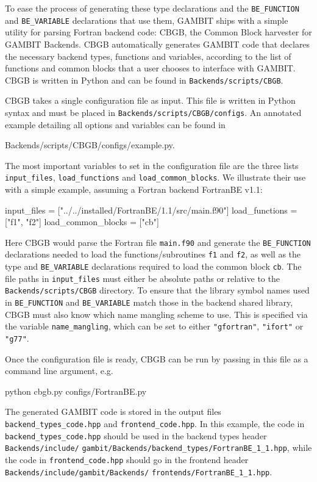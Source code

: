 \documentclass[pdftex,twocolumn,epjc3_preprint,runningheads]{svjour3}
\renewcommand{\_}{\discretionary{\underscore}{}{\underscore}}
\newcommand\cpp[1]{{\lstinline!#1!}}  %
\newcommand\term[1]{{\lstset{style=terminal}\lstinline!#1!\lstset{style=cpp}}}
\newcommand\fortran[1]{{\lstset{style=fortran}\lstinline!#1!\lstset{style=cpp}}}
\newcommand\py[1]{{\lstset{style=python}\lstinline!#1!\lstset{style=cpp}}}
\newcommand{\gambit}{\textsf{GAMBIT}\xspace}
\newcommand{\GB}{\gambit}
\newcommand\Python{\textsf{Python}\xspace}
\newcommand\python{\Python}
\newcommand\Fortran{\textsf{Fortran}\xspace}
\begin{document}
To ease the process of generating these type declarations and the \cpp{BE_FUNCTION} and \cpp{BE_VARIABLE} declarations that use them, \GB ships with a simple utility for parsing \Fortran backend code: \textsf{CBGB}, the Common Block harvester for \GB Backends.  \textsf{CBGB} automatically generates \GB code that declares the necessary backend types, functions and variables, according to the list of functions and common blocks that a user chooses to interface with \GB. \textsf{CBGB} is written in \Python and can be found in \term{Backends/scripts/CBGB}.

\textsf{CBGB} takes a single configuration file as input. This file is written in \python syntax and must be placed in \term{Backends/scripts/CBGB/configs}. An annotated example detailing all options and variables can be found in
\begin{lstterm}
Backends/scripts/CBGB/configs/example.py.
\end{lstterm}
The most important variables to set in the configuration file are the three lists \py{input_files}, \py{load_functions} and \py{load_common_blocks}. We illustrate their use with a simple example, assuming a Fortran backend \textsf{FortranBE} v1.1:
\begin{lstpy}
input_files =
  ["../../installed/FortranBE/1.1/src/main.f90"]
load_functions = ["f1", "f2"]
load_common_blocks = ["cb"]
\end{lstpy}
Here \textsf{CBGB} would parse the Fortran file \term{main.f90} and generate the \cpp{BE_FUNCTION} declarations needed to load the functions/subroutines \fortran{f1} and \fortran{f2}, as well as the type and \cpp{BE_VARIABLE} declarations required to load the common block \fortran{cb}. The file paths in \py{input_files} must either be absolute paths or relative to the \term{Backends/scripts/CBGB} directory. To ensure that the library symbol names used in \cpp{BE_FUNCTION} and \cpp{BE_VARIABLE} match those in the backend shared library, \textsf{CBGB} must also know which name mangling scheme to use. This is specified via the variable \py{name_mangling}, which can be set to either \py{"gfortran"}, \py{"ifort"} or \py{"g77"}.

Once the configuration file is ready, \textsf{CBGB} can be run by passing in this file as a command line argument, e.g.\
\begin{lstterm}
python cbgb.py configs/FortranBE.py
\end{lstterm}
The generated \GB code is stored in the output files \term{backend_types_code.hpp} and \term{frontend_code.hpp}. In this example, the code in \term{backend_types_code.hpp} should be used in the backend types header \term{Backends/include/} \term{gambit/Backends/backend_types/FortranBE_1_1.hpp}, while the code in \term{frontend_code.hpp} should go in the frontend header \term{Backends/include/gambit/Backends/} \term{frontends/FortranBE_1_1.hpp}.
\end{document}
